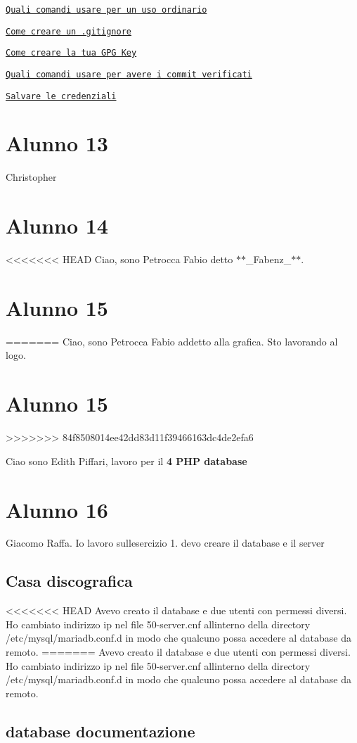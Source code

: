 \href{https://gist.github.com/simonemastella/90364ec267d65a5328bd97c23aee1864}{\tt Quali comandi usare per un uso ordinario}

\href{https://gist.github.com/simonemastella/e69cd0a0d9fe151e52c0fc53ac4ad3ea}{\tt Come creare un .gitignore}

\href{https://gist.github.com/simonemastella/2ad4f08ed6f18af7e102a8e1a573dd8d}{\tt Come creare la tua G\+PG Key}

\href{https://gist.github.com/simonemastella/3e763531b32e1db583e2dcb4fdd668a8}{\tt Quali comandi usare per avere i commit verificati}

\href{https://gist.github.com/simonemastella/ecd089c6106a961eb9272a40c5b16d5a}{\tt Salvare le credenziali} \section*{Alunno 13}

Christopher \section*{Alunno 14}

<<<<<<< HEAD
Ciao, sono Petrocca Fabio detto $\ast$$\ast$\+\_\+\+Fabenz\+\_\+$\ast$$\ast$. \section*{Alunno 15}
=======
Ciao, sono Petrocca Fabio addetto alla grafica. Sto lavorando al logo. \section*{Alunno 15}
>>>>>>> 84f8508014ee42dd83d11f39466163dc4de2efa6

Ciao sono Edith Piffari, lavoro per il {\bfseries 4 P\+HP database} \section*{Alunno 16}

Giacomo Raffa. Io lavoro sull\textquotesingle{}esercizio 1. devo creare il database e il server \subsection*{Casa discografica}

<<<<<<< HEAD
Avevo creato il database e due utenti con permessi diversi. Ho cambiato indirizzo ip nel file 50-\/server.\+cnf all\textquotesingle{}interno della directory /etc/mysql/mariadb.conf.\+d in modo che qualcuno possa accedere al database da remoto.
=======
Avevo creato il database e due utenti con permessi diversi. Ho cambiato indirizzo ip nel file 50-\/server.\+cnf all\textquotesingle{}interno della directory /etc/mysql/mariadb.conf.\+d in modo che qualcuno possa accedere al database da remoto. \subsection*{database documentazione}

